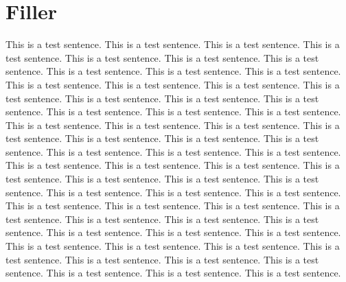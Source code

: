 \documentclass[twoside,10pt]{article}
\begin{document}
\section{Filler}

This is a test sentence. This is a test sentence.  This is a test sentence. This is a test sentence. This is a test sentence.  This is a test sentence. This is a test sentence. This is a test sentence.  This is a test sentence. This is a test sentence. This is a test sentence.  This is a test sentence. This is a test sentence. This is a test sentence.  This is a test sentence. This is a test sentence. This is a test sentence.  This is a test sentence. This is a test sentence. This is a test sentence.  This is a test sentence. This is a test sentence. This is a test sentence.  This is a test sentence. This is a test sentence. This is a test sentence.  This is a test sentence. This is a test sentence. This is a test sentence.  This is a test sentence. This is a test sentence. This is a test sentence.  This is a test sentence. This is a test sentence. This is a test sentence.  This is a test sentence. This is a test sentence. This is a test sentence.  This is a test sentence. This is a test sentence. This is a test sentence.  This is a test sentence. This is a test sentence. This is a test sentence.  This is a test sentence. This is a test sentence. This is a test sentence.  This is a test sentence. This is a test sentence. This is a test sentence.  This is a test sentence. This is a test sentence. This is a test sentence.  This is a test sentence. This is a test sentence. This is a test sentence.  This is a test sentence. This is a test sentence. This is a test sentence.  This is a test sentence.


\end{document}

